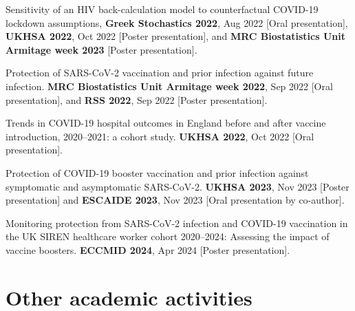 \begin{spacing}{0.9}
    \begin{description}
        \item Sensitivity of an HIV back-calculation model to counterfactual COVID-19 lockdown assumptions, \textbf{Greek Stochastics 2022}, Aug 2022 [Oral presentation], \textbf{UKHSA 2022}, Oct 2022 [Poster presentation], and \textbf{MRC Biostatistics Unit Armitage week 2023} [Poster presentation]. %
        \item Protection of SARS-CoV-2 vaccination and prior infection against future infection. \textbf{MRC Biostatistics Unit Armitage week 2022}, Sep 2022 [Oral presentation], and \textbf{RSS 2022}, Sep 2022 [Poster presentation].
        \item Trends in COVID-19 hospital outcomes in England before and after vaccine introduction, 2020--2021: a cohort study. \textbf{UKHSA 2022}, Oct 2022 [Oral presentation].
        \item Protection of COVID-19 booster vaccination and prior infection against symptomatic and asymptomatic SARS-CoV-2. \textbf{UKHSA 2023}, Nov 2023 [Poster presentation] and \textbf{ESCAIDE 2023}, Nov 2023 [Oral presentation by co-author].
        \item Monitoring protection from SARS-CoV-2 infection and COVID-19 vaccination in the UK SIREN healthcare worker cohort 2020--2024: Assessing the impact of vaccine boosters. \textbf{ECCMID 2024}, Apr 2024 [Poster presentation].
    \end{description}

    \section*{Other academic activities}


\end{spacing}
